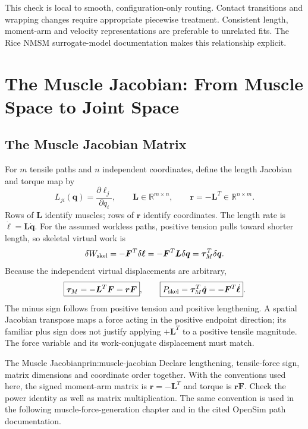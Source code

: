 This check is local to smooth, configuration-only routing. Contact transitions and wrapping changes require appropriate piecewise treatment. Consistent length, moment-arm and velocity representations are preferable to unrelated fits. The Rice NMSM surrogate-model documentation makes this relationship explicit. \citep{RiceMuscleSurrogate}

\section{The Muscle Jacobian: From Muscle Space to Joint Space}
\label{sec:muscle-jacobian}

\subsection{The Muscle Jacobian Matrix}

For $m$ tensile paths and $n$ independent coordinates, define the length Jacobian and torque map by
\[
L_{ji}(\bm q)=\frac{\partial\ell_j}{\partial q_i},\qquad
\bm L\in\mathbb R^{m\times n},\qquad
\bm r=-\bm L^T\in\mathbb R^{n\times m}.
\]
Rows of $\bm L$ identify muscles; rows of $\bm r$ identify coordinates. The length rate is $\dot{\bm\ell}=\bm L\dot{\bm q}$. For the assumed workless paths, positive tension pulls toward shorter length, so skeletal virtual work is
\[
\delta W_{\rm skel}=-\bm F^T\delta\bm\ell
=-\bm F^T\bm L\delta\bm q
=\bm\tau_M^T\delta\bm q.
\]
Because the independent virtual displacements are arbitrary,
\[
\boxed{\bm\tau_M=-\bm L^T\bm F=\bm r\bm F},\qquad
\boxed{P_{\rm skel}=\bm\tau_M^T\dot{\bm q}
=-\bm F^T\dot{\bm\ell}}.
\]
The minus sign follows from positive tension and positive lengthening. A spatial Jacobian transpose maps a force acting in the positive endpoint direction; its familiar plus sign does not justify applying $+\bm L^T$ to a positive tensile magnitude. The force variable and its work-conjugate displacement must match.

\begin{principle}{The Muscle Jacobian}{prin:muscle-jacobian}
Declare lengthening, tensile-force sign, matrix dimensions and coordinate order together. With the conventions used here, the signed moment-arm matrix is $\bm r=-\bm L^T$ and torque is $\bm r\bm F$. Check the power identity as well as matrix multiplication. The same convention is used in the following muscle-force-generation chapter and in the cited OpenSim path documentation. \citep{OpenSimFunctionBasedPath45}
\end{principle}

